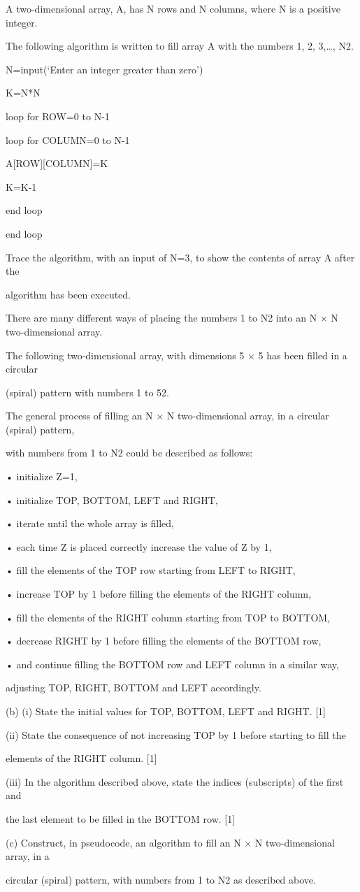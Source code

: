 A two-dimensional array, A, has N rows and N columns, where N is a positive integer.

The following algorithm is written to fill array A with the numbers 1, 2, 3,…, N2.

N=input(‘Enter an integer greater than zero’)

K=N*N

loop for ROW=0 to N-1

loop for COLUMN=0 to N-1

A[ROW][COLUMN]=K

K=K-1

end loop

end loop


Trace the algorithm, with an input of N=3, to show the contents of array A after the

algorithm has been executed.


There are many different ways of placing the numbers 1 to N2 into an N × N two-dimensional array.

The following two-dimensional array, with dimensions 5 × 5 has been filled in a circular

(spiral) pattern with numbers 1 to 52.




The general process of filling an N × N two-dimensional array, in a circular (spiral) pattern,

with numbers from 1 to N2 could be described as follows:

• initialize Z=1,

• initialize TOP, BOTTOM, LEFT and RIGHT,

• iterate until the whole array is filled,

• each time Z is placed correctly increase the value of Z by 1,

• fill the elements of the TOP row starting from LEFT to RIGHT,

• increase TOP by 1 before filling the elements of the RIGHT column,

• fill the elements of the RIGHT column starting from TOP to BOTTOM,

• decrease RIGHT by 1 before filling the elements of the BOTTOM row,

• and continue filling the BOTTOM row and LEFT column in a similar way,

adjusting TOP, RIGHT, BOTTOM and LEFT accordingly.

(b) (i) State the initial values for TOP, BOTTOM, LEFT and RIGHT. [1]

(ii) State the consequence of not increasing TOP by 1 before starting to fill the

elements of the RIGHT column. [1]

(iii)	 In the algorithm described above, state the indices (subscripts) of the first and

the last element to be filled in the BOTTOM row. [1]

(c)	 Construct, in pseudocode, an algorithm to fill an N × N two-dimensional array, in a

circular (spiral) pattern, with numbers from 1 to N2 as described above.